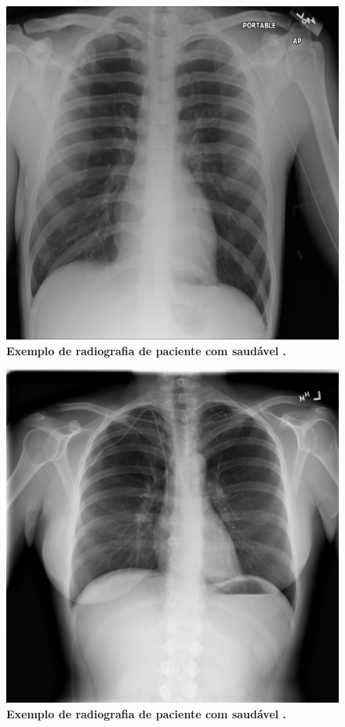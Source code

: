 \documentclass[
12pt,        %
oneside,     %
a4paper,     %
english,       %
brazil        %
%
%
]{ppgca}
\begin{document}
\begin{figure}[H]
    \includegraphics[scale=0.3]{saudavel1.png}
    \centering
    \caption{\textbf{Exemplo de radiografia de paciente com saudável \cite{repo4}.}}
    \label{fig:saudavel1}
\end{figure}

\begin{figure}[H]
    \includegraphics[scale=0.3]{saudavel2.png}
    \centering
    \caption{\textbf{Exemplo de radiografia de paciente com saudável \cite{repo4}.}}
    \label{fig:saudavel2}
\end{figure}
\end{document}
